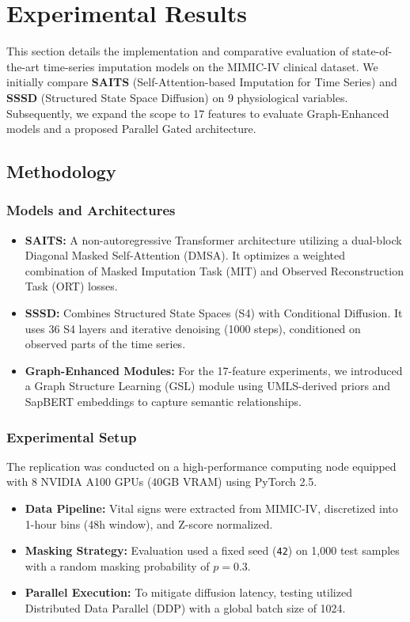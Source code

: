 \section{Experimental Results}
This section details the implementation and comparative evaluation of state-of-the-art time-series imputation models on the MIMIC-IV clinical dataset. We initially compare \textbf{SAITS} (Self-Attention-based Imputation for Time Series) and \textbf{SSSD} (Structured State Space Diffusion) on 9 physiological variables. Subsequently, we expand the scope to 17 features to evaluate Graph-Enhanced models and a proposed Parallel Gated architecture.

\subsection{Methodology}

\subsubsection{Models and Architectures}
\begin{itemize}
    \item \textbf{SAITS:} A non-autoregressive Transformer architecture utilizing a dual-block Diagonal Masked Self-Attention (DMSA). It optimizes a weighted combination of Masked Imputation Task (MIT) and Observed Reconstruction Task (ORT) losses.
    \item \textbf{SSSD:} Combines Structured State Spaces (S4) with Conditional Diffusion. It uses 36 S4 layers and iterative denoising (1000 steps), conditioned on observed parts of the time series.
    \item \textbf{Graph-Enhanced Modules:} For the 17-feature experiments, we introduced a Graph Structure Learning (GSL) module using UMLS-derived priors and SapBERT embeddings to capture semantic relationships.
\end{itemize}

\subsubsection{Experimental Setup}
The replication was conducted on a high-performance computing node equipped with 8 NVIDIA A100 GPUs (40GB VRAM) using PyTorch 2.5.
\begin{itemize}
    \item \textbf{Data Pipeline:} Vital signs were extracted from MIMIC-IV, discretized into 1-hour bins (48h window), and Z-score normalized.
    \item \textbf{Masking Strategy:} Evaluation used a fixed seed (\texttt{42}) on 1,000 test samples with a random masking probability of $p=0.3$.
    \item \textbf{Parallel Execution:} To mitigate diffusion latency, testing utilized Distributed Data Parallel (DDP) with a global batch size of 1024.
\end{itemize}

